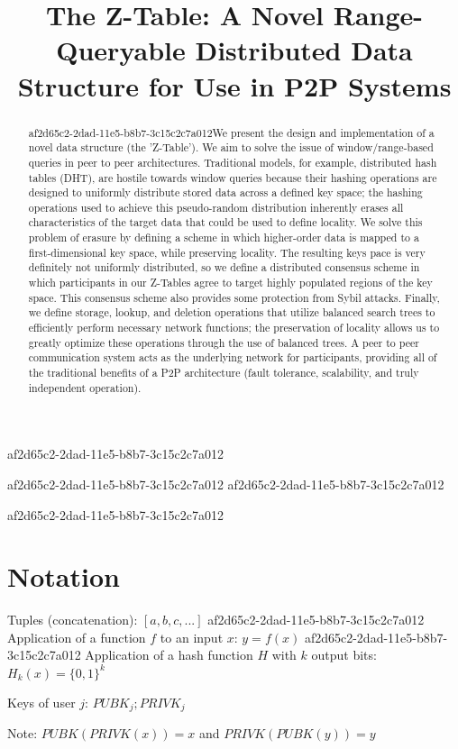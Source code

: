 \documentclass[12pt]{article}
\title{The Z-Table: A Novel Range-Queryable Distributed Data Structure for Use in P2P Systems}
\begin{document}
af2d65c2-2dad-11e5-b8b7-3c15c2c7a012\maketitle
af2d65c2-2dad-11e5-b8b7-3c15c2c7a012
af2d65c2-2dad-11e5-b8b7-3c15c2c7a012\begin{abstract}
af2d65c2-2dad-11e5-b8b7-3c15c2c7a012We present the design and implementation of a novel data structure (the 'Z-Table'). We aim to solve the issue of window/range-based queries in peer to peer architectures. Traditional models, for example,  distributed hash tables (DHT), are hostile towards window queries because their hashing operations are designed to uniformly distribute stored data across a defined key space; the hashing operations used to achieve this pseudo-random distribution inherently erases all characteristics of the target data that could be used to define locality. We solve this problem of erasure by defining a scheme in which higher-order data is mapped to a first-dimensional key space, while preserving locality. The resulting keys pace is very definitely not uniformly distributed, so we define a distributed consensus scheme in which participants in our Z-Tables agree to target highly populated regions of the key space. This consensus scheme also provides some protection from Sybil attacks. Finally, we define storage, lookup, and deletion operations that utilize balanced search trees to efficiently perform necessary network functions; the preservation of locality allows us to greatly optimize these operations through the use of balanced trees. A peer to peer communication system acts as the underlying network for participants, providing all of the traditional benefits of a P2P architecture (fault tolerance, scalability, and truly independent operation).
\end{abstract}
af2d65c2-2dad-11e5-b8b7-3c15c2c7a012
\section{Notation}

Tuples (concatenation): $[a,b,c,...]$
af2d65c2-2dad-11e5-b8b7-3c15c2c7a012
Application of a function $f$ to an input $x$: $y=f(x)$
af2d65c2-2dad-11e5-b8b7-3c15c2c7a012
Application of a hash function $H$ with $k$ output bits: $H_{k}(x) = \{0,1\}^k$

Keys of user $j$: $ PUBK_j; PRIVK_j $

Note: $PUBK(PRIVK(x)) = x$ and $PRIVK(PUBK(y)) = y$~
\end{document}
